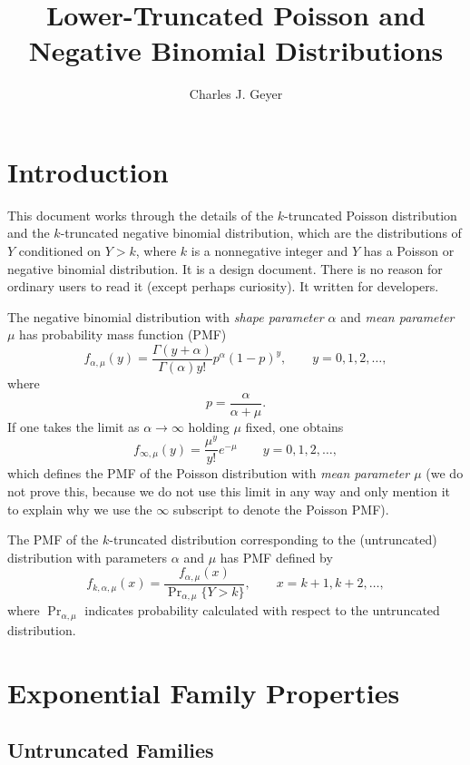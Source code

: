 \documentclass[11pt]{article}
\newcommand{\Prsub}[1]{\Pr\nolimits_{#1}}
\begin{document}
\title{Lower-Truncated Poisson and Negative Binomial Distributions}
\author{Charles J. Geyer}
\maketitle


\section{Introduction}

This document works through the details of the $k$-truncated Poisson
distribution and the $k$-truncated negative binomial distribution,
which are the distributions of $Y$ conditioned on $Y > k$, where $k$
is a nonnegative integer and $Y$ has a Poisson or negative binomial
distribution.  It is a design document.  There is no reason for ordinary
users to read it (except perhaps curiosity).  It written for developers.

The negative binomial distribution with \emph{shape parameter $\alpha$}
and \emph{mean parameter $\mu$} has probability mass function (PMF)
$$
   f_{\alpha, \mu}(y)
   =
   \frac{\Gamma(y + \alpha)}{\Gamma(\alpha) y !} p^\alpha (1 - p)^y,
   \qquad y = 0, 1, 2, \ldots,
$$
where
$$
   p = \frac{\alpha}{\alpha + \mu}.
$$
If one takes the limit as $\alpha \to \infty$ holding $\mu$ fixed,
one obtains
$$
   f_{\infty, \mu}(y)
   =
   \frac{\mu^y}{y !} e^{- \mu}
   \qquad y = 0, 1, 2, \ldots,
$$
which defines the PMF of the Poisson distribution
with \emph{mean parameter $\mu$}
(we do not prove this, because we do not use this limit in any way
and only mention it to explain why we use the $\infty$ subscript to
denote the Poisson PMF).

The PMF of the $k$-truncated distribution corresponding to the (untruncated)
distribution with parameters $\alpha$ and $\mu$ has PMF defined by
\begin{equation} \label{eq:pmf-trunc-one}
   f_{k, \alpha, \mu}(x)
   =
   \frac{f_{\alpha, \mu}(x)}{\Prsub{\alpha, \mu}\{Y > k\}},
   \qquad x = k + 1, k + 2, \ldots,
\end{equation}
where $\Prsub{\alpha, \mu}$ indicates probability calculated with
respect to the untruncated distribution.

\section{Exponential Family Properties}

\subsection{Untruncated Families}
\end{document}
